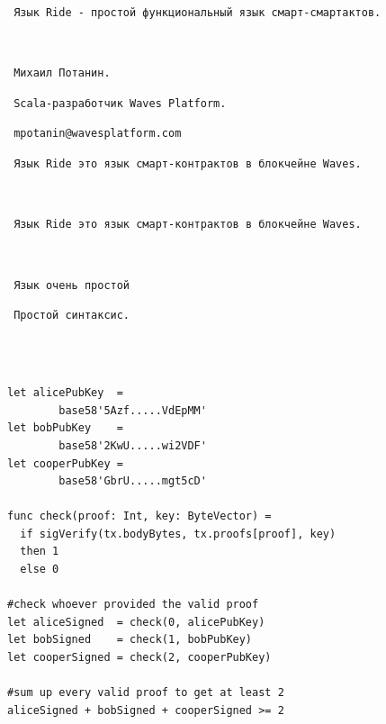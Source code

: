 \documentclass[11pt,handout,pdf,hyperref={unicode}]{beamer}
\begin{document}
\pagestyle{plain}

\begin{frame}

\texttt{ }

\texttt{ Язык Ride - простой функциональный язык смарт-смартактов. }

\texttt{ }

\texttt{ Михаил Потанин. }

\texttt{ Scala-разработчик Waves Platform. }

\texttt{ mpotanin@wavesplatform.com }

\end{frame}

\begin{frame}

\texttt{ Язык Ride это язык смарт-контрактов в блокчейне Waves. }

\end{frame}

\begin{frame}

\texttt{ }

\texttt{ Язык Ride это язык смарт-контрактов в блокчейне Waves. }

\texttt{ }

\texttt{ Язык очень простой }

\end{frame}


\begin{frame}[fragile]

\texttt{ Простой синтаксис. }

\texttt{ }

\begin{verbatim}

let alicePubKey  =
        base58'5Azf.....VdEpMM'
let bobPubKey    =
        base58'2KwU.....wi2VDF'
let cooperPubKey =
        base58'GbrU.....mgt5cD'

func check(proof: Int, key: ByteVector) =
  if sigVerify(tx.bodyBytes, tx.proofs[proof], key)
  then 1
  else 0

#check whoever provided the valid proof
let aliceSigned  = check(0, alicePubKey)
let bobSigned    = check(1, bobPubKey)
let cooperSigned = check(2, cooperPubKey)

#sum up every valid proof to get at least 2
aliceSigned + bobSigned + cooperSigned >= 2

\end{verbatim}
\end{frame}
\end{document}
